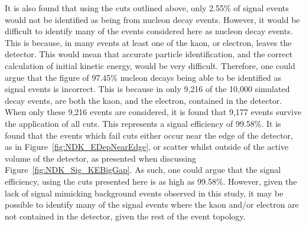 It is also found that using the cuts outlined above, only 2.55\% of signal events would not be identified as being from nucleon decay events. However, it would be difficult to identify many of the events considered here as nucleon decay events. This is because, in many events at least one of the kaon, or electron, leaves the detector. This would mean that accurate particle identification, and the correct calculation of initial kinetic energy, would be very difficult. Therefore, one could argue that the figure of 97.45\% nucleon decays being able to be identified as signal events is incorrect. This is because in only 9,216 of the 10,000 simulated decay events, are both the kaon, and the electron, contained in the detector. When only these 9,216 events are considered, it is found that 9,177 events survive the application of all cuts. This represents a signal efficiency of 99.58\%. It is found that the events which fail cuts either occur near the edge of the detector, as in Figure~\ref{fig:NDK_EDepNearEdge}, or scatter whilst outside of the active volume of the detector, as presented when discussing Figure~\ref{fig:NDK_Sig_KEBigGap}. As such, one could argue that the signal efficiency, using the cuts presented here is as high as 99.58\%. However, given the lack of signal mimicking background events observed in this study, it may be possible to identify many of the signal events where the kaon and/or electron are not contained in the detector, given the rest of the event topology. \\

